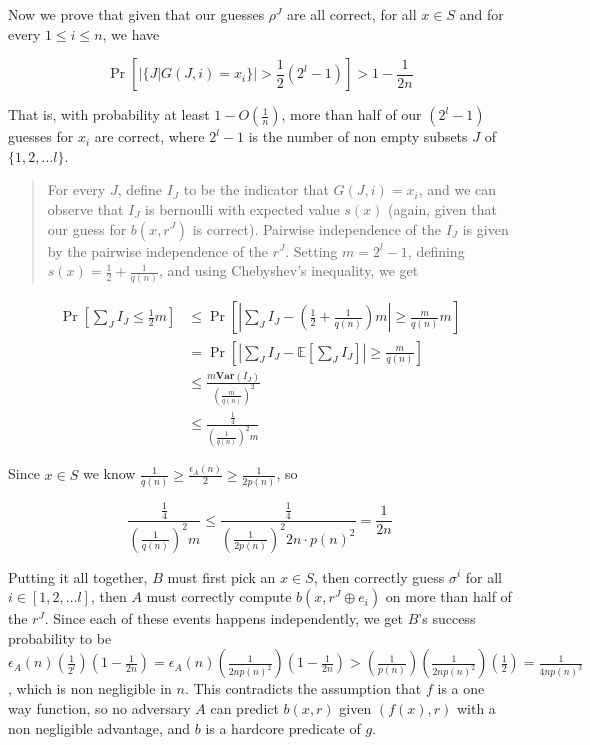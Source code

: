 Now we prove that given that our guesses \(\rho^J\) are all correct, for
all \(x \in S\) and for every \(1 \leq i \leq n\), we have

\[\Pr \left[ \left| \{ J | G(J, i) = x_i \} \right| > \frac{1}{2}(2^l - 1) \right] > 1 - \frac{1}{2n}\]

That is, with probability at least \(1 - O(\tfrac{1}{n})\), more than
half of our \((2^l - 1)\) guesses for \(x_i\) are correct, where
\(2^l - 1\) is the number of non empty subsets \(J\) of
\(\{1, 2, \dots l\}\).

\begin{quote}
For every \(J\), define \(I_J\) to be the indicator that
\(G(J, i) = x_i\), and we can observe that \(I_J\) is bernoulli with
expected value \(s(x)\) (again, given that our guess for \(b(x, r^J)\)
is correct). Pairwise independence of the \(I_J\) is given by the
pairwise independence of the \(r^J\). Setting \(m = 2^l - 1\), defining
\(s(x) = \tfrac{1}{2} + \tfrac{1}{q(n)}\), and using Chebyshev's
inequality, we get
\end{quote}

\[
\begin{aligned}
    \Pr \left[ \sum_{J}I_J \leq \frac{1}{2}m \right] &\leq \Pr \left[ \left| \sum_{J} I_J - \left(\frac{1}{2} + \frac{1}{q(n)} \right) m \right| \geq \frac{m}{q(n)}m \right] \\
    &= \Pr \left[ \left| \sum_{J} I_J - \mathbb{E} \left[ \sum_{J} I_J \right] \right| \geq \frac{m}{q(n)} \right] \\
    &\leq \frac{m \mathbf{Var}(I_J)}{\left(\frac{m}{q(n)}\right)^2} \\
    &\leq \frac{\frac{1}{4}}{\left( \frac{1}{q(n)} \right)^2 m}
\end{aligned}
\]

Since \(x \in S\) we know
\(\frac{1}{q(n)} \geq \frac{\epsilon_A(n)}{2} \geq \frac{1}{2p(n)}\), so

\[\frac{\frac{1}{4}}{\left( \frac{1}{q(n)} \right)^2 m} \leq \frac{\frac{1}{4}}{\left( \frac{1}{2p(n)} \right)^2 2n \cdot p(n)^2} = \frac{1}{2n} \]

Putting it all together, \(B\) must first pick an \(x \in S\), then
correctly guess \(\sigma^i\) for all \(i \in [1, 2, \dots l]\), then
\(A\) must correctly compute \(b(x, r^J \oplus e_i)\) on more than half
of the \(r^J\). Since each of these events happens independently, we get
\(B\)'s success probability to be
\(\epsilon_A(n) (\tfrac{1}{2^l})(1 - \tfrac{1}{2n}) = \epsilon_A(n) (\tfrac{1}{2n p(n)^2}) ( 1 - \tfrac{1}{2n}) > (\tfrac{1}{p(n)})(\tfrac{1}{2np(n)^2})(\tfrac{1}{2}) = \tfrac{1}{4n p(n)^3}\),
which is non negligible in \(n\). This contradicts the assumption that
\(f\) is a one way function, so no adversary \(A\) can predict
\(b(x, r)\) given \((f(x), r)\) with a non negligible advantage, and
\(b\) is a hardcore predicate of \(g\).

